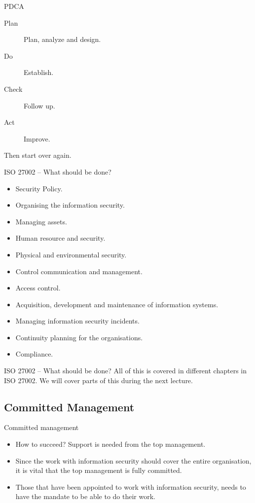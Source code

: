 \documentclass{beamer}
\begin{document}
\begin{frame}{PDCA}
  \begin{description}
    \item[Plan] Plan, analyze and design.
    \item[Do] Establish.
    \item[Check] Follow up.
    \item[Act] Improve.
  \end{description}
  Then start over again.
\end{frame}

\begin{frame}{ISO 27002 -- What should be done?}
  \begin{itemize}
    \item Security Policy.
    \item Organising the information security.
    \item Managing assets.
    \item Human resource and security.
    \item Physical and environmental security.
    \item Control communication and management.
    \item Access control.
    \item Acquisition, development and maintenance of information systems.
    \item Managing information security incidents.
    \item Continuity planning for the organisations.
    \item Compliance.
  \end{itemize}
\end{frame}

\begin{frame}{ISO 27002 -- What should be done?}
  All of this is covered in different chapters in ISO 27002. We will cover parts
  of this during the next lecture.
\end{frame}

\subsection{Committed Management}

\begin{frame}{Committed management}
  \begin{itemize}
    \item How to succeed?
      Support is needed from the top management.

    \item Since the work with information security should cover the entire
      organisation, it is vital that the top management is fully committed.

    \item Those that have been appointed to work with information security,
      needs to have the mandate to be able to do their work.

  \end{itemize}
\end{frame}
\end{document}
